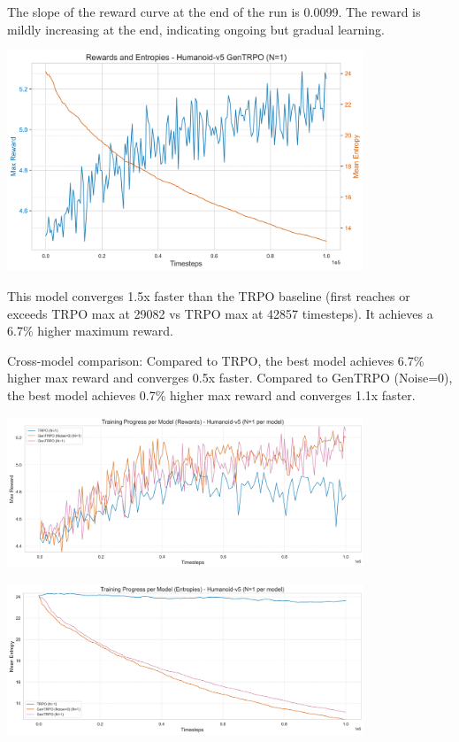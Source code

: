 \documentclass{svproc}
\begin{document}
The slope of the reward curve at the end of the run is 0.0099. The reward is mildly increasing at the end, indicating ongoing but gradual learning.

\begin{center}
\includegraphics[width=0.8\textwidth]{graph_Humanoid-v5_gentrpo-ne_rewards_entropies.png}
\end{center}

This model converges 1.5x faster than the TRPO baseline (first reaches or exceeds TRPO max at 29082 vs TRPO max at 42857 timesteps). It achieves a 6.7\% higher maximum reward.

Cross-model comparison: Compared to TRPO, the best model achieves 6.7\% higher max reward and converges 0.5x faster. Compared to GenTRPO (Noise=0), the best model achieves 0.7\% higher max reward and converges 1.1x faster. 

\begin{center}
\includegraphics[width=0.8\textwidth]{graph_Humanoid-v5_models_rewards.png}
\end{center}

\begin{center}
\includegraphics[width=0.8\textwidth]{graph_Humanoid-v5_models_entropies.png}
\end{center}
\end{document}
